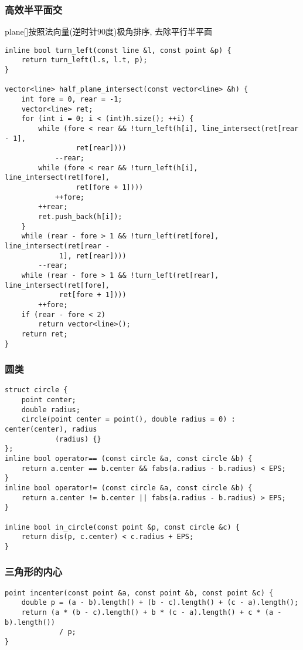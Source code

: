 \documentclass{article}
\begin{document}
\subsubsection{高效半平面交}

plane{[}{]}按照法向量(逆时针$90$度)极角排序, 去除平行半平面

\begin{lstlisting}
inline bool turn_left(const line &l, const point &p) {
    return turn_left(l.s, l.t, p);
}

vector<line> half_plane_intersect(const vector<line> &h) {
    int fore = 0, rear = -1;
    vector<line> ret;
    for (int i = 0; i < (int)h.size(); ++i) {
        while (fore < rear && !turn_left(h[i], line_intersect(ret[rear - 1],
                 ret[rear])))
            --rear;
        while (fore < rear && !turn_left(h[i], line_intersect(ret[fore],
                 ret[fore + 1])))
            ++fore;
        ++rear;
        ret.push_back(h[i]);
    }
    while (rear - fore > 1 && !turn_left(ret[fore], line_intersect(ret[rear -
             1], ret[rear])))
        --rear;
    while (rear - fore > 1 && !turn_left(ret[rear], line_intersect(ret[fore],
             ret[fore + 1])))
        ++fore;
    if (rear - fore < 2)
        return vector<line>();
    return ret;
}
\end{lstlisting}

\subsubsection{圆类}

\begin{lstlisting}
struct circle {
    point center;
    double radius;
    circle(point center = point(), double radius = 0) : center(center), radius
            (radius) {}
};
inline bool operator== (const circle &a, const circle &b) {
    return a.center == b.center && fabs(a.radius - b.radius) < EPS;
}
inline bool operator!= (const circle &a, const circle &b) {
    return a.center != b.center || fabs(a.radius - b.radius) > EPS;
}

inline bool in_circle(const point &p, const circle &c) {
    return dis(p, c.center) < c.radius + EPS;
}
\end{lstlisting}

\subsubsection{三角形的内心}

\begin{lstlisting}
point incenter(const point &a, const point &b, const point &c) {
    double p = (a - b).length() + (b - c).length() + (c - a).length();
    return (a * (b - c).length() + b * (c - a).length() + c * (a - b).length())
             / p;
}
\end{lstlisting}
\end{document}

